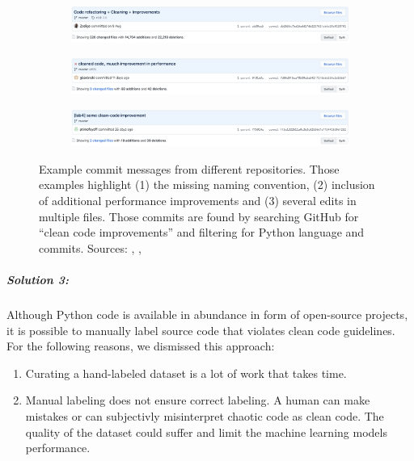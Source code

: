 \begin{figure}
    \begin{subfigure}{\textwidth}
        \includegraphics[width=1\linewidth]{img/ML/commit_messages/screen_1.png}
    \end{subfigure}
    \begin{subfigure}{\textwidth}
        \includegraphics[width=1\linewidth]{img/ML/commit_messages/screen_2.png}
    \end{subfigure}
    \begin{subfigure}{\textwidth}
        \includegraphics[width=1\linewidth]{img/ML/commit_messages/screen_3.png}
    \end{subfigure}
    \caption[Example commit messages that underline the inconsistency in commit message naming]%
    {Example commit messages from different repositories. Those examples highlight (1) the missing naming convention, (2) inclusion of additional performance improvements and (3) several edits in multiple files. Those commits are found by searching GitHub for \enquote{clean code improvements} and filtering for Python language and commits. Sources: \footnotemark[1], \footnotemark[2], \footnotemark[3]  }
    \label{fig:commit_messages}
\end{figure}
\subparagraph{Solution 3:}
Although Python code is available in abundance in form of open-source projects, it is possible to manually label source code that violates clean code guidelines. 
For the following reasons, we dismissed this approach:
\begin{enumerate}
    \item Curating a hand-labeled dataset is a lot of work that takes time. 
    \item Manual labeling does not ensure correct labeling. A human can make mistakes or can subjectivly misinterpret chaotic code as clean code. The quality of the dataset could suffer and limit the machine learning models performance.
\end{enumerate}
